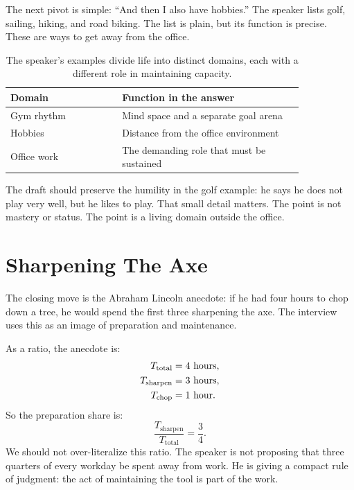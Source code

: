 The next pivot is simple: ``And then I also have hobbies.'' The speaker lists golf, sailing, hiking, and road biking. The list is plain, but its function is precise. These are ways to get away from the office.

\begin{table}
\centering
\begin{tabular}{p{0.32\linewidth} p{0.52\linewidth}}
\hline
Domain & Function in the answer \\
\hline
Gym rhythm & Mind space and a separate goal arena \\
Hobbies & Distance from the office environment \\
Office work & The demanding role that must be sustained \\
\hline
\end{tabular}
\caption{The speaker's examples divide life into distinct domains, each with a different role in maintaining capacity.}
\end{table}

The draft should preserve the humility in the golf example: he says he does not play very well, but he likes to play. That small detail matters. The point is not mastery or status. The point is a living domain outside the office.

\section{Sharpening The Axe}

The closing move is the Abraham Lincoln anecdote: if he had four hours to chop down a tree, he would spend the first three sharpening the axe. The interview uses this as an image of preparation and maintenance.

As a ratio, the anecdote is:
\begin{align}
T_{\mathrm{total}} &= 4\ \hbox{hours},\\
T_{\mathrm{sharpen}} &= 3\ \hbox{hours},\\
T_{\mathrm{chop}} &= 1\ \hbox{hour}.
\end{align}
So the preparation share is:
\begin{equation}
\frac{T_{\mathrm{sharpen}}}{T_{\mathrm{total}}}
=
\frac{3}{4}.
\end{equation}
We should not over-literalize this ratio. The speaker is not proposing that three quarters of every workday be spent away from work. He is giving a compact rule of judgment: the act of maintaining the tool is part of the work.

